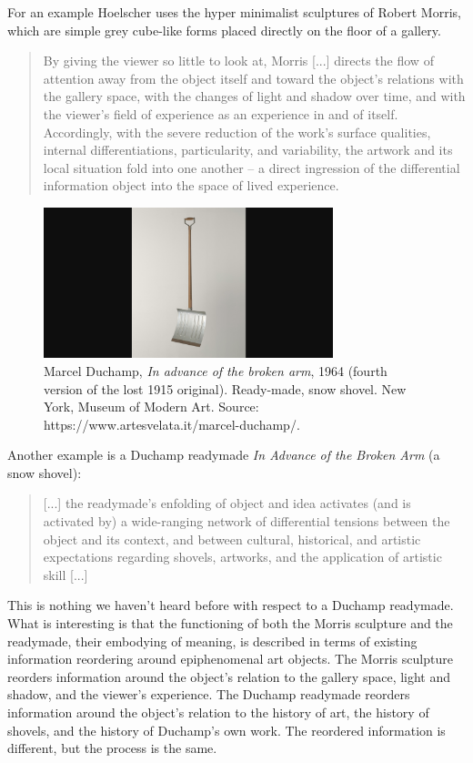 \documentclass[letterpaper]{article}
\begin{document}
    For an example Hoelscher uses the hyper minimalist sculptures of Robert Morris, which are simple grey cube-like forms placed directly on the floor of a gallery.

    \begin{quote}
        By giving the viewer so little to look at, Morris [...] directs the flow of attention away from the object itself and toward the object's relations with the gallery space, with the changes of light and shadow over time, and with the viewer's field of experience as an experience in and of itself. Accordingly, with the severe reduction of the work's surface qualities, internal differentiations, particularity, and variability, the artwork and its local situation fold into one another – a direct ingression of the differential information object into the space of lived experience. \citep[p.78]{HoelscherArtAsInfrmtn2021}
    \end{quote}

    \begin{figure}[h]
    \includegraphics[width=3.31in]{snow-shovel.png}
    \caption{Marcel Duchamp, \emph{In advance of the broken arm}, 1964 (fourth version of the lost 1915 original). Ready-made, snow shovel. New York, Museum of Modern Art. Source: https://www.artesvelata.it/marcel-duchamp/.}
    \end{figure}

    Another example is a Duchamp readymade \emph{In Advance of the Broken Arm} (a snow shovel):

    \begin{quote}
        [...] the readymade's enfolding of object and idea activates (and is activated by) a wide-ranging network of differential tensions between the object and its context, and between cultural, historical, and artistic expectations regarding shovels, artworks, and the application of artistic skill [...]
    \end{quote}

    This is nothing we haven't heard before with respect to a Duchamp readymade. What is interesting is that the functioning of both the Morris sculpture and the readymade, their embodying of meaning, is described in terms of existing information reordering around epiphenomenal art objects. The Morris sculpture reorders information around the object's relation to the gallery space, light and shadow, and the viewer's experience. The Duchamp readymade reorders information around the object's relation to the history of art, the history of shovels, and the history of Duchamp's own work. The reordered information is different, but the process is the same.
\end{document}
